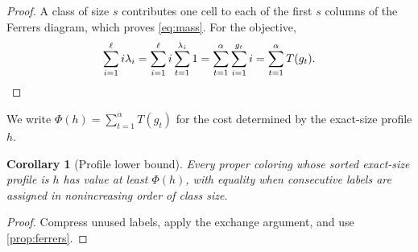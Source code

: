 \documentclass[11pt]{article}
\newtheorem{corollary}[theorem]{Corollary}
\theoremstyle{definition}
\begin{document}
\begin{proof}
A class of size $s$ contributes one cell to each of the first $s$ columns of
the Ferrers diagram, which proves \eqref{eq:mass}. For the objective,
\[
  \sum_{i=1}^{\ell}i\lambda_i
  =\sum_{i=1}^{\ell}i\sum_{t=1}^{\lambda_i}1
  =\sum_{t=1}^{\alpha}\sum_{i=1}^{g_t}i
  =\sum_{t=1}^{\alpha}T(g_t).\qedhere
\]
\end{proof}

We write $\Phi(h)=\sum_{t=1}^{\alpha}T(g_t)$ for the cost determined by the
exact-size profile $h$.

\begin{corollary}[Profile lower bound]
\label{cor:ferrers-lower}
Every proper coloring whose sorted exact-size profile is $h$ has value at
least $\Phi(h)$, with equality when consecutive labels are assigned in
nonincreasing order of class size.
\end{corollary}

\begin{proof}
Compress unused labels, apply the exchange argument, and use
\cref{prop:ferrers}.
\end{proof}
\end{document}
